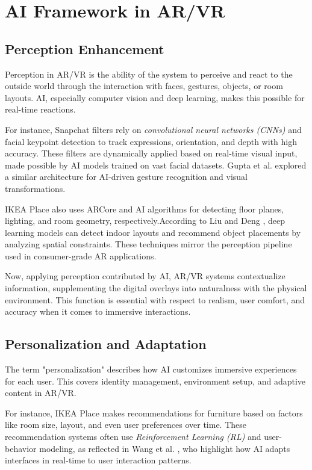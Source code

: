 \documentclass[conference]{IEEEtran}
\begin{document}
\section{AI Framework in AR/VR}

\subsection{Perception Enhancement}
Perception in AR/VR is the ability of the system to perceive and react to the outside world through the interaction with faces, gestures, objects, or room layouts. AI, especially computer vision and deep learning, makes this possible for real-time reactions.

For instance, Snapchat filters rely on \textit{convolutional neural networks (CNNs)} and facial keypoint detection to track expressions, orientation, and depth with high accuracy. These filters are dynamically applied based on real-time visual input, made possible by AI models trained on vast facial datasets. Gupta et al. \cite{Gupta2025} explored a similar architecture for AI-driven gesture recognition and visual transformations.

IKEA Place also uses ARCore and AI algorithms for detecting floor planes, lighting, and room geometry, respectively.According to Liu and Deng \cite{Liu2025}, deep learning models can detect indoor layouts and recommend object placements by analyzing spatial constraints. These techniques mirror the perception pipeline used in consumer-grade AR applications.

Now, applying perception contributed by AI, AR/VR systems contextualize information, supplementing the digital overlays into naturalness with the physical environment. This function is essential with respect to realism, user comfort, and accuracy when it comes to immersive interactions.

\subsection{Personalization and Adaptation}
The term "personalization" describes how AI customizes immersive experiences for each user. This covers identity management, environment setup, and adaptive content in AR/VR.

For instance, IKEA Place makes recommendations for furniture based on factors like room size, layout, and even user preferences over time. These recommendation systems often use \textit{Reinforcement Learning (RL)} and user-behavior modeling, as reflected in Wang et al. \cite{Wang2025}, who highlight how AI adapts interfaces in real-time to user interaction patterns.
\end{document}
